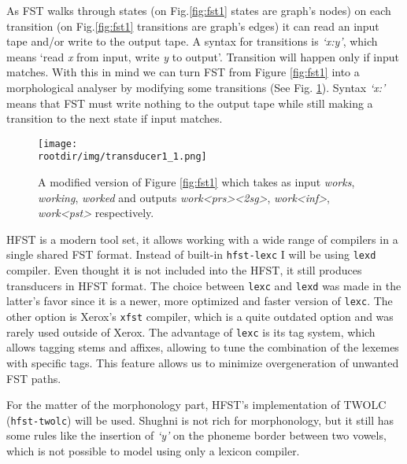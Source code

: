 \par As FST walks through states (on Fig.\ref{fig:fst1} states are graph's nodes) on each transition (on Fig.\ref{fig:fst1} transitions are graph's edges) it can read an input tape and/or write to the output tape. A syntax for transitions is \textit{`x:y'}, which means `read \textit{x} from input, write \textit{y} to output'. Transition will happen only if input matches. With this in mind we can turn FST from Figure \ref{fig:fst1} into a morphological analyser by modifying some transitions (See Fig. \ref{fig:fst1_1}). Syntax \textit{`x:'} means that FST must write nothing to the output tape while still making a transition to the next state if input matches.
\begin{figure}[!ht]
    \centering
    \texttt{[image: \\rootdir/img/transducer1\_1.png]}
    \caption{A modified version of Figure \ref{fig:fst1} which takes as input \textit{works}, \textit{working}, \textit{worked} and outputs \textit{work<prs><2sg>}, \textit{work<inf>}, \textit{work<pst>} respectively.}
    \label{fig:fst1_1}
\end{figure}
\par HFST is a modern tool set, it allows working with a wide range of compilers in a single shared FST format. Instead of built-in \texttt{hfst-lexc} I will be using \texttt{lexd} compiler. Even thought it is not included into the HFST, it still produces transducers in HFST format. The choice between \texttt{lexc} and \texttt{lexd} was made in the latter's favor since it is a newer, more optimized and faster version of \texttt{lexc}. The other option is Xerox's \texttt{xfst} compiler, which is a quite outdated option and was rarely used outside of Xerox. The advantage of \texttt{lexc} is its tag system, which allows tagging stems and affixes, allowing to tune the combination of the lexemes with specific tags. This feature allows us to minimize overgeneration of unwanted FST paths.
\par For the matter of the morphonology part, HFST's implementation of TWOLC (\texttt{hfst-twolc}) will be used. Shughni is not rich for morphonology, but it still has some rules like the insertion of \textit{`y'} on the phoneme border between two vowels, which is not possible to model using only a lexicon compiler.
